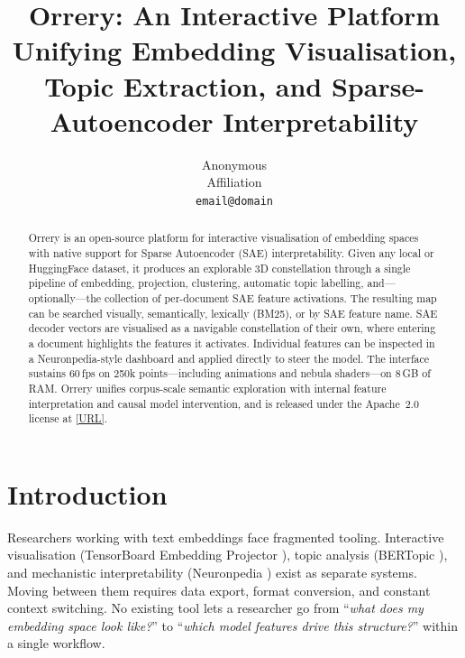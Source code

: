 \documentclass[11pt]{article}
\title{Orrery: An Interactive Platform Unifying Embedding Visualisation,
Topic Extraction, and Sparse-Autoencoder Interpretability}
\author{
  Anonymous \\
  Affiliation \\
  \texttt{email@domain} \\
}
\begin{document}
\maketitle

\begin{abstract}
Orrery is an open-source platform for interactive visualisation of
embedding spaces with native support for Sparse Autoencoder (SAE)
interpretability. Given any local or HuggingFace dataset, it produces an
explorable 3D constellation through a single pipeline of embedding,
projection, clustering, automatic topic labelling, and---optionally---the
collection of per-document SAE feature activations. The resulting map can
be searched visually, semantically, lexically (BM25), or by SAE feature
name. SAE decoder vectors are visualised as a navigable constellation of
their own, where entering a document highlights the features it activates.
Individual features can be inspected in a Neuronpedia-style dashboard and
applied directly to steer the model. The interface sustains 60\,fps on
250k points---including animations and nebula shaders---on 8\,GB of RAM.
Orrery unifies corpus-scale semantic exploration with internal feature
interpretation and causal model intervention, and is released under the
Apache~2.0 license at \url{[URL]}.
\end{abstract}

\section{Introduction}
\label{sec:intro}

Researchers working with text embeddings face fragmented tooling.
Interactive visualisation (TensorBoard Embedding Projector
\citep{smilkov2016projector}), topic analysis (BERTopic
\citep{grootendorst2022bertopic}), and mechanistic interpretability
(Neuronpedia \citep{neuronpedia}) exist as separate systems. Moving
between them requires data export, format conversion, and constant context
switching. No existing tool lets a researcher go from ``\emph{what does my
embedding space look like?}'' to ``\emph{which model features drive this
structure?}'' within a single workflow.
\end{document}

